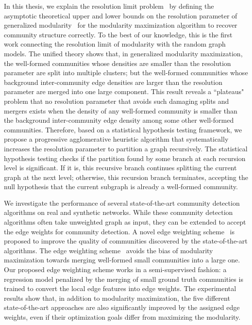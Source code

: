 In this thesis, we explain the resolution limit problem~\cite{fortunato2007resolution} by defining the asymptotic theoretical upper and lower bounds on the resolution parameter of generalized modularity~\cite{lu2019asymptotic} for the modularity maximization algorithm to recover community structure correctly. To the best of our knowledge, this is the first work connecting the resolution limit of modularity with the random graph models. The unified theory shows that, in generalized modularity maximization, the well-formed communities whose densities are smaller than the resolution parameter are split into multiple clusters; but the well-formed communities whose background inter-community edge densities are larger than the resolution parameter are merged into one large component. This result reveals a ``plateaus" problem that no resolution parameter that avoids such damaging splits and mergers exists when the density of any well-formed community is smaller than the background inter-community edge density among some other well-formed communities. Therefore, based on a statistical hypothesis testing framework, we propose a progressive agglomerative heuristic algorithm that systematically increases the resolution parameter to partition a graph recursively. The statistical hypothesis testing checks if the partition found by some branch at each recursion level is significant. If it is, this recursive branch continues splitting the current graph at the next level; otherwise, this recursion branch terminates, accepting the null hypothesis that the current subgraph is already a well-formed community.

We investigate the performance of several state-of-the-art community detection algorithms on real and synthetic networks. While these community detection algorithms often take unweighted graph as input, they can be extended to accept the edge weights for community detection. A novel edge weighting scheme~\cite{lu2018adaptive} is proposed to improve the quality of communities discovered by the state-of-the-art algorithms. The edge weighting scheme~\cite{lu2018adaptive} avoids the bias of modularity maximization towards merging well-formed small communities into a large one. Our proposed edge weighting scheme works in a semi-supervised fashion: a regression model penalized by the merging of small ground truth communities is trained to convert the local edge features into edge weights. The experimental results show that, in addition to modularity maximization, the five different state-of-the-art approaches are also significantly improved by the assigned edge weights, even if their optimization goals differ from maximizing the modularity.

